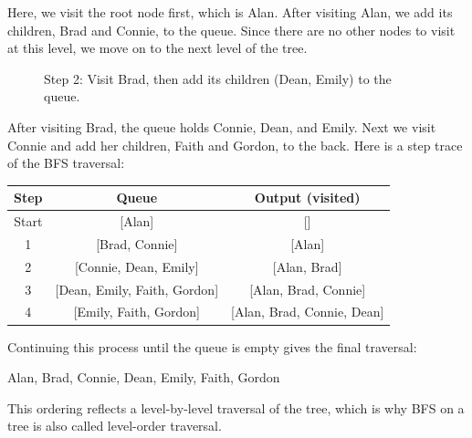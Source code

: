 Here, we visit the root node first, which is Alan. After visiting Alan, we add its children, Brad and Connie, to the queue. Since there are no other nodes to visit at this level, we move on to the next level of the tree.
\begin{figure}[H]
    \centering

    \caption{Step 2: Visit Brad, then add its children (Dean, Emily) to the queue.}
\end{figure}
After visiting Brad, the queue holds Connie, Dean, and Emily. Next we visit Connie and add her children, Faith and Gordon, to the back. Here is a step trace of the BFS traversal:
\begin{center}
    \begin{tabular}{c|c|c}
        Step  & Queue                        & Output (visited)           \\
        \hline
        Start & [Alan]                       & []                         \\
        1     & [Brad, Connie]               & [Alan]                     \\
        2     & [Connie, Dean, Emily]        & [Alan, Brad]               \\
        3     & [Dean, Emily, Faith, Gordon] & [Alan, Brad, Connie]       \\
        4     & [Emily, Faith, Gordon]       & [Alan, Brad, Connie, Dean] \\
    \end{tabular}
\end{center}

Continuing this process until the queue is empty gives the final traversal:

\begin{center}
    Alan, Brad, Connie, Dean, Emily, Faith, Gordon
\end{center}

This ordering reflects a level-by-level traversal of the tree, which is why BFS on a tree is also called level-order traversal.

